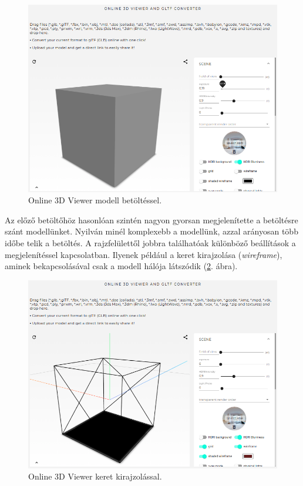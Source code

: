 \begin{figure}[h]
\centering
\includegraphics[width=\textwidth]{images/3D_creators_2.png}
\caption{Online 3D Viewer modell betöltéssel.}
\label{fig:3d2}
\end{figure}

Az előző betöltőhöz hasonlóan szintén nagyon gyorsan megjelenítette a betöltésre szánt modellünket. Nyilván minél komplexebb a modellünk, azzal arányosan több időbe telik a betöltés.
 \newpage
A rajzfelülettől jobbra találhatóak különböző beállítások a megjelenítéssel kapcsolatban. Ilyenek például a keret kirajzolása (\textit{wireframe}), aminek bekapcsolásával csak a modell hálója látszódik (\ref{fig:3d3}. ábra).

\begin{figure}[h]
\centering
\includegraphics[width=\textwidth]{images/3D_creators_4.png}
\caption{Online 3D Viewer keret kirajzolással.}
\label{fig:3d3}
\end{figure}

